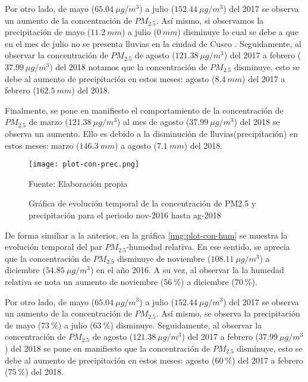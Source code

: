 \documentclass[a4paper,11pt]{article}
\begin{document}
\newpage

Por otro lado, de mayo ($65.04\ \mu g/m^3$) a julio ($152.44\ \mu g/m^3$) del 2017 se observa un aumento de la concentración de $PM_{2.5}$. Así mismo, si observamos la precipitación de mayo ($11.2\ mm$) a julio ($0\ mm$) disminuye lo cual se debe a que en el mes de julio no se presenta lluvias en la ciudad de Cusco . Seguidamente, al observar la concentración de $PM_{2.5}$ de agosto ($121.38\ \mu g/m^3$) del 2017 a febrero ($37.99\ \mu g/m^3$) del 2018 notamos que la concentración de $PM_{2.5}$ disminuye, esto se debe al aumento de precipitación en estos meses: agosto ($8.4\ mm$) del 2017 a febrero ($162.5\ mm$) del 2018.

Finalmente, se pone en manifiesto el comportamiento de la concentración de $PM_{2.5}$ de marzo ($121.38\ \mu g/m^3$) al mes de agosto ($37.99\ \mu g/m^3$) del 2018 se observa un aumento. Ello es debido a la disminución de lluvias(precipitación) en estos meses: marzo ($146.3\ mm$) a agosto ($7.1\ mm$) del 2018.




\begin{figure}[H]
	\centering
     \texttt{[image: plot-con-prec.png]}
	\caption{Gráfica de evolución temporal de la concentración de PM2.5 y precipitación para el periodo nov-2016 hasta ag-2018}	
    \label{img:plot-con-prec}
    
    \centerline{Fuente: Elaboración propia }
\end{figure}


De forma similiar a la anterior, en la gráfica  \ref{img:plot-con-hum} se muestra la evolución temporal del par $PM_{2.5}$-humedad relativa. En ese sentido, se aprecia que la concentración de $PM_{2.5}$ disminuye de noviembre ($108.11\ \mu g/m^3$) a diciembre ($54.85\ \mu g/m^3$) en el año 2016. A su vez, al observar la la humedad relativa se nota un aumento de noviembre ($56\ \%$) a diciembre ($70\ \%$).

Por otro lado, de mayo ($65.04\ \mu g/m^3$) a julio ($152.44\ \mu g/m^3$) del 2017 se observa un aumento de la concentración de $PM_{2.5}$. Así mismo, se observa la precipitación de mayo ($73\ \%$) a julio ($63\ \%$) disminuye. Seguidamente, al observar la concentración de $PM_{2.5}$ de agosto ($121.38\ \mu g/m^3$) del 2017 a febrero ($37.99\ \mu g/m^3$) del 2018 se pone en manifiesto que la concentración de $PM_{2.5}$ disminuye, esto se debe al aumento de precipitación en estos meses: agosto ($60\ \%$) del 2017 a febrero ($75\ \%$) del 2018.
\end{document}

